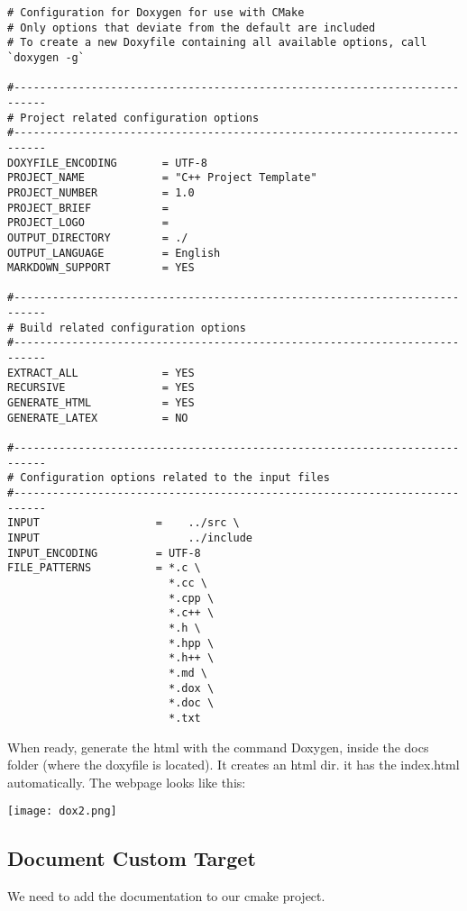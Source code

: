 \begin{verbatim}
# Configuration for Doxygen for use with CMake
# Only options that deviate from the default are included
# To create a new Doxyfile containing all available options, call `doxygen -g`

#---------------------------------------------------------------------------
# Project related configuration options
#---------------------------------------------------------------------------
DOXYFILE_ENCODING       = UTF-8
PROJECT_NAME            = "C++ Project Template"
PROJECT_NUMBER          = 1.0
PROJECT_BRIEF           =
PROJECT_LOGO            =
OUTPUT_DIRECTORY        = ./
OUTPUT_LANGUAGE         = English
MARKDOWN_SUPPORT        = YES

#---------------------------------------------------------------------------
# Build related configuration options
#---------------------------------------------------------------------------
EXTRACT_ALL             = YES
RECURSIVE               = YES
GENERATE_HTML           = YES
GENERATE_LATEX          = NO

#---------------------------------------------------------------------------
# Configuration options related to the input files
#---------------------------------------------------------------------------
INPUT                  =    ../src \
INPUT                       ../include
INPUT_ENCODING         = UTF-8
FILE_PATTERNS          = *.c \
                         *.cc \
                         *.cpp \
                         *.c++ \
                         *.h \
                         *.hpp \
                         *.h++ \
                         *.md \
                         *.dox \
                         *.doc \
                         *.txt
\end{verbatim}

When ready, generate the html with the command Doxygen, inside the docs folder (where the doxyfile is located). It creates an html dir.
it has the index.html automatically. The webpage looks like this:


\begin{center}
    \texttt{[image: dox2.png]}
\end{center}


\subsection{Document Custom Target}

We need to add the documentation to our cmake project.

